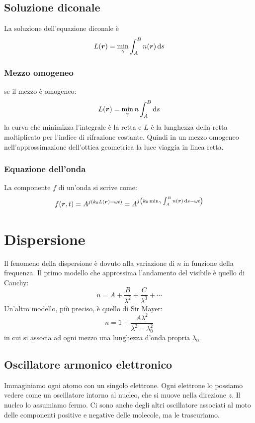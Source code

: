 \subsection{Soluzione diconale}
La soluzione dell'equazione diconale è
\begin{equation}
  L(\boldsymbol{r})=\min_{\gamma}\int_A^B n(\boldsymbol{r})\,\mathrm{d} s
\end{equation}
\subsubsection{Mezzo omogeneo}
se il mezzo è omogeneo:
\begin{equation}
  L(\boldsymbol{r})=\min_{\gamma}n\int_A^B\mathrm{d} s
\end{equation}
la curva che minimizza l'integrale è la retta e $L$ è la lunghezza della retta moltiplicato per l'indice di rifrazione costante. Quindi in un mezzo omogeneo nell'approssimazione dell'ottica geometrica la luce viaggia in linea retta.
\subsubsection{Equazione dell'onda}
La componente $f$ di un'onda si scrive come:
\begin{equation}
  f(\boldsymbol{r},t)=A^{j\left(k_0L(\boldsymbol{r})-\omega t\right)}=A^{j\left(k_0\min_\gamma\int_A^B n(\boldsymbol{r})\,\mathrm{d} s-\omega t\right)}
\end{equation}


\section{Dispersione}
Il fenomeno della dispersione è dovuto alla variazione di $n$ in funzione della frequenza. Il primo modello che approssima l'andamento del visibile è quello di Cauchy:
\begin{equation}
  n=A+\frac{B}{\lambda^2}+\frac{C}{\lambda^3}+\cdots
\end{equation}
Un'altro modello, più preciso, è quello di Sir Mayer:
\begin{equation}
  n=1+\frac{A\lambda^2}{\lambda^2-\lambda_0^2}
  \label{Mayerdisp}
\end{equation}
in cui si associa ad ogni mezzo una lunghezza d'onda propria $\lambda_0$.
\subsection{Oscillatore armonico elettronico}
Immaginiamo ogni atomo con un singolo elettrone. Ogni elettrone lo possiamo vedere come un oscillatore intorno al nucleo, che si muove nella direzione $z$. Il nucleo lo assumiamo fermo. Ci sono anche degli altri oscillatore associati al moto delle componenti positive e negative delle molecole, ma le trascuriamo.


